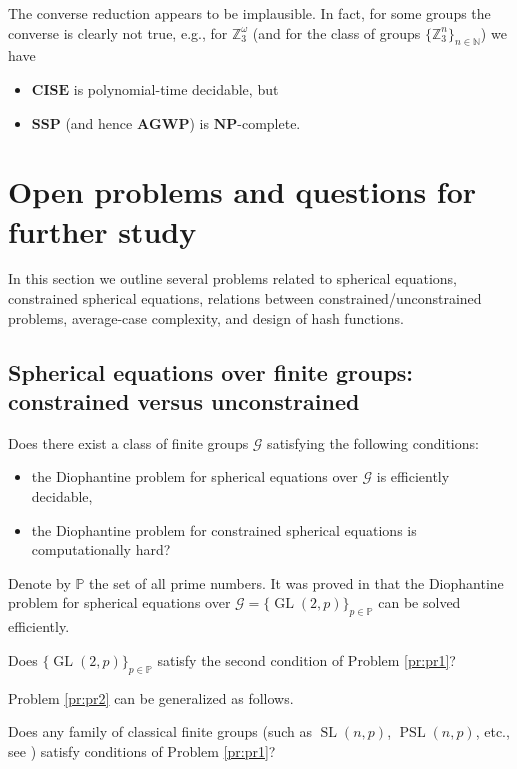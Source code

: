 \documentclass{jgcc}
\newcommand{\prm}{\mathbb{P}}
\def\CG{{\mathcal G}}
\def\NP{{\mathbf{NP}}}
\def\AGP{{\mathbf{AGWP}}}
\def\MN{{\mathbb{N}}}
\def\MZ{{\mathbb{Z}}}
\def\SSP{{\mathbf{SSP}}}
\def\CISE{{\mathbf{CISE}}}
\DeclareMathOperator{\SL}{{SL}}
\DeclareMathOperator{\PSL}{{PSL}}
\DeclareMathOperator{\GL}{{GL}}
\begin{document}
The converse reduction appears to be implausible.
In fact, for some groups the converse is clearly not true, 
e.g., for $\MZ_3^\omega$ 
(and for the class of groups $\{\MZ_3^n\}_{n\in\MN}$)
we have
\begin{itemize}
\item 
$\CISE$ is polynomial-time decidable, but
\item 
$\SSP$ (and hence $\AGP$) is $\NP$-complete.
\end{itemize}


\section{Open problems and questions for further study}

In this section we outline several problems related to 
spherical equations, 
constrained spherical equations,
relations between constrained/unconstrained problems,
average-case complexity, and design of hash functions.

\subsection{Spherical equations over finite groups: constrained versus unconstrained}

\begin{prob}\label{pr:pr1}
Does there exist a class of finite groups $\CG$ satisfying 
the following conditions:
\begin{itemize}
\item 
the Diophantine problem for spherical equations over $\CG$
is efficiently decidable,
\item 
the Diophantine problem for constrained
spherical equations is computationally hard?
\end{itemize}
\end{prob}

Denote by $\prm$ the set of all prime numbers.
It was proved in \cite{Mattes-Ushakov-Weiss:2024}
that the Diophantine problem for
spherical equations over $\CG=\{\GL(2,p)\}_{p \in \prm}$
can be solved efficiently.

\begin{prob}\label{pr:pr2}
Does $\{\GL(2,p)\}_{p \in \prm}$ satisfy the second condition of Problem \ref{pr:pr1}?
\end{prob}

Problem \ref{pr:pr2} can be generalized as follows.

\begin{prob}\label{pr:pr3}
Does any family of classical finite groups 
(such as $\SL(n,p)$, $\PSL(n,p)$, etc., see \cite{Kleidman-Liebeck:1990}) 
satisfy conditions of Problem \ref{pr:pr1}?
\end{prob}
\end{document}
